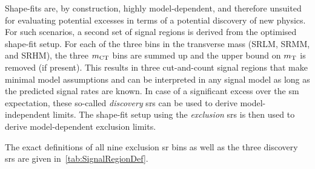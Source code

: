 Shape-fits are, by construction, highly model-dependent, and therefore unsuited for evaluating potential excesses in terms of a potential discovery of new physics. For such scenarios, a second set of signal regions is derived from the optimised shape-fit setup. For each of the three bins in the transverse mass (SRLM, SRMM, and SRHM), the three $m_{\textrm{CT}}$ bins are summed up and the upper bound on $m_{\textrm{T}}$ is removed (if present). This results in three cut-and-count signal regions that make minimal model assumptions and can be interpreted in any signal model as long as the predicted signal rates are known. In case of a significant excess over the \gls{sm} expectation, these so-called \textit{discovery} \glspl{sr} can be used to derive model-independent limits. The shape-fit setup using the \textit{exclusion} \glspl{sr} is then used to derive model-dependent exclusion limits.

The exact definitions of all nine exclusion \gls{sr} bins as well as the three discovery \glspl{sr} are given in~\cref{tab:SignalRegionDef}.


